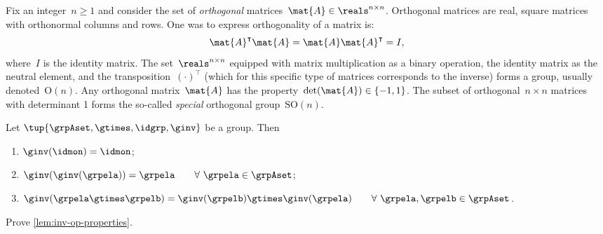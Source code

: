 \begin{example}
  Fix an integer~$n\geq 1$ and consider the set of \emph{orthogonal} matrices~$\mat{A}\in \reals^{n\times n}$. Orthogonal matrices are real, square matrices with orthonormal columns and rows. One was to express orthogonality of a matrix is:
  \begin{equation*}
    \mat{A}^\intercal \mat{A}=\mat{A}\mat{A}^\intercal = I,
  \end{equation*}
  where~$I$ is the identity matrix. The set~$\reals^{n\times n}$ equipped with matrix multiplication as a binary operation, the identity matrix as the neutral element, and the transposition~$(\cdot)^\intercal$ (which for this specific type of matrices corresponds to the inverse) forms a group, usually denoted~$\text{O}(n)$.
  Any orthogonal matrix~$\mat{A}$ has the property~$\det(\mat{A})\in \{-1,1\}$. The subset of orthogonal~$n\times n$ matrices with determinant 1 forms the so-called \emph{special} orthogonal group~$\text{SO}(n)$.
\end{example}


\begin{lemma}
  \label{lem:inv-op-properties}
  Let $\tup{\grpAset, \gtimes, \idgrp, \ginv}$ be a group. Then
  \begin{enumerate}
    \item\label{eq:group-neutral-invariant} $\ginv(\idmon) = \idmon$;
    \item\label{eq:group-inverse-inverse}  $ \ginv(\ginv(\grpela)) = \grpela \quad \quad \forall \  \grpela \in \grpAset$;
    \item\label{eq:group-inverse-of-composition} $\ginv(\grpela \gtimes \grpelb ) = \ginv(\grpelb) \gtimes \ginv(\grpela) \quad \quad \forall \ \grpela, \grpelb \in \grpAset$.
  \end{enumerate}
\end{lemma}
\begin{gradedexercise}
  Prove \cref{lem:inv-op-properties}.
\end{gradedexercise}
